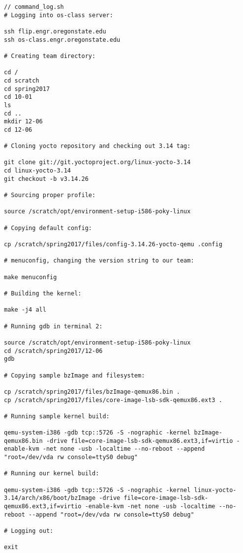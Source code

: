 \documentclass[10pt,onecolumn,journal,draftclsnofoot]{IEEEtran}
\begin{document}
\begin{lstlisting}
// command_log.sh
# Logging into os-class server:

ssh flip.engr.oregonstate.edu
ssh os-class.engr.oregonstate.edu

# Creating team directory:

cd /
cd scratch
cd spring2017
cd 10-01
ls
cd ..
mkdir 12-06
cd 12-06

# Cloning yocto repository and checking out 3.14 tag:

git clone git://git.yoctoproject.org/linux-yocto-3.14
cd linux-yocto-3.14
git checkout -b v3.14.26

# Sourcing proper profile:

source /scratch/opt/environment-setup-i586-poky-linux

# Copying default config:

cp /scratch/spring2017/files/config-3.14.26-yocto-qemu .config

# menuconfig, changing the version string to our team:

make menuconfig

# Building the kernel:

make -j4 all

# Running gdb in terminal 2:

source /scratch/opt/environment-setup-i586-poky-linux
cd /scratch/spring2017/12-06
gdb

# Copying sample bzImage and filesystem:

cp /scratch/spring2017/files/bzImage-qemux86.bin .
cp /scratch/spring2017/files/core-image-lsb-sdk-qemux86.ext3 .

# Running sample kernel build:

qemu-system-i386 -gdb tcp::5726 -S -nographic -kernel bzImage-qemux86.bin -drive file=core-image-lsb-sdk-qemux86.ext3,if=virtio -enable-kvm -net none -usb -localtime --no-reboot --append "root=/dev/vda rw console=ttyS0 debug"

# Running our kernel build:

qemu-system-i386 -gdb tcp::5726 -S -nographic -kernel linux-yocto-3.14/arch/x86/boot/bzImage -drive file=core-image-lsb-sdk-qemux86.ext3,if=virtio -enable-kvm -net none -usb -localtime --no-reboot --append "root=/dev/vda rw console=ttyS0 debug"

# Logging out:

exit
\end{lstlisting}
\end{document}
